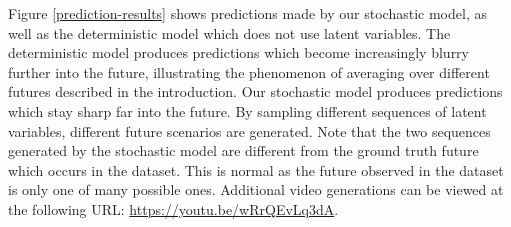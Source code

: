 \documentclass{article} %
\begin{document}
    Figure \ref{prediction-results} shows predictions made by our stochastic model, as well as the deterministic model which does not use latent variables.
    The deterministic model produces predictions which become increasingly blurry further into the future, illustrating the phenomenon of averaging over different futures described in the introduction. Our stochastic model produces predictions which stay sharp far into the future.
    By sampling different sequences of latent variables, different future scenarios are generated.
    Note that the two sequences generated by the stochastic model are different from the ground truth future which occurs in the dataset.
    This is normal as the future observed in the dataset is only one of many possible ones.
    Additional video generations can be viewed at the following URL: \url{https://youtu.be/wRrQEvLq3dA}.
\end{document}
